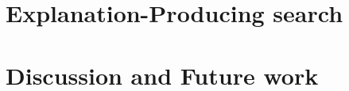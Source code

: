 \documentclass{llncs}
\begin{document}
\section{Explanation-Producing search}\label{sec:explanation}

\section{Discussion and Future work}\label{sec:experiments}

% 
%
%


\end{document}
